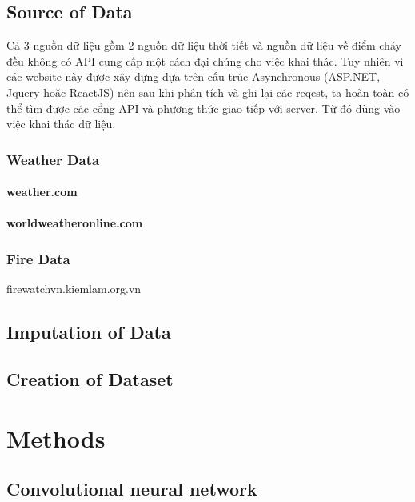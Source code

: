 \documentclass{article}
\begin{document}
\subsection{Source of Data}

\qquad Cả 3 nguồn dữ liệu gồm 2 nguồn dữ liệu thời tiết và nguồn dữ liệu về điểm cháy đều không có API cung cấp một cách đại chúng cho việc khai thác. Tuy nhiên vì các website này được xây dựng dựa trên cấu trúc Asynchronous (ASP.NET, Jquery hoặc ReactJS) nên sau khi phân tích và ghi lại các reqest, ta hoàn toàn có thể tìm được các cổng API và phương thức giao tiếp với server. Từ đó dùng vào việc khai thác dữ liệu.

\subsubsection{Weather Data}
\paragraph{weather.com}

\paragraph{worldweatheronline.com}

\subsubsection{Fire Data}
firewatchvn.kiemlam.org.vn

\subsection{Imputation of Data}
\subsection{Creation of Dataset}



\section{Methods}

\subsection{Convolutional neural network}
\end{document}
